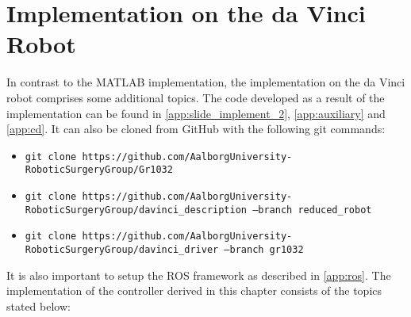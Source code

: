 \section{Implementation on the da Vinci Robot}
In contrast to the MATLAB implementation, the implementation on the da Vinci robot comprises  some additional topics. The code developed as a result of the implementation can be found in \autoref{app:slide_implement_2}, \autoref{app:auxiliary} and \autoref{app:cd}. It can also be cloned from GitHub with the following git commands:
\begin{itemize}
\item \texttt{git clone https://github.com/AalborgUniversity-RoboticSurgeryGroup/Gr1032}
\item \texttt{git clone https://github.com/AalborgUniversity-RoboticSurgeryGroup/\newline davinci\_description ---branch reduced\_robot} 
\item \texttt{git clone https://github.com/AalborgUniversity-RoboticSurgeryGroup/\newline davinci\_driver ---branch gr1032}
\end{itemize}
It is also important to setup the ROS framework as described in \autoref{app:ros}. The implementation of the controller derived in this chapter consists of the topics stated below:
